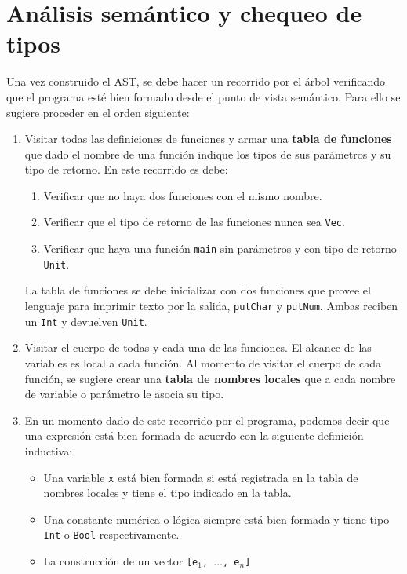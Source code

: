 \documentclass{article}
\begin{document}
\section{An\'alisis sem\'antico y chequeo de tipos}
\label{sec_analizador_semantico}

Una vez construido el AST, se debe hacer un recorrido por el \'arbol
verificando que el programa est\'e bien formado desde el punto de
vista sem\'antico. Para ello se sugiere proceder en el orden siguiente:
\begin{enumerate}
\item Visitar todas las definiciones de funciones y armar una {\bf tabla de funciones}
      que dado el nombre de una funci\'on indique los tipos de sus par\'ametros
      y su tipo de retorno. En este recorrido es debe:
      \begin{enumerate}
      \item Verificar que no haya dos funciones con el mismo nombre.
      \item Verificar que el tipo de retorno de las funciones nunca sea \texttt{Vec}.
      \item Verificar que haya una funci\'on \texttt{main} sin
            par\'ametros y con tipo de retorno \texttt{Unit}.
      \end{enumerate}
      La tabla de funciones se debe inicializar con dos funciones que
      provee el lenguaje para imprimir texto por la salida,
      \texttt{putChar} y \texttt{putNum}. Ambas reciben un \texttt{Int}
      y devuelven \texttt{Unit}.
\item Visitar el cuerpo de todas y cada una de las funciones.
      El alcance de las variables es local a cada funci\'on.
      Al momento de visitar el cuerpo de cada funci\'on, se sugiere crear una
      {\bf tabla de nombres locales} que a cada nombre de variable o par\'ametro
      le asocia su tipo.
\item En un momento dado de este recorrido por el programa,
      podemos decir que una expresi\'on est\'a bien formada
      de acuerdo con la siguiente definici\'on inductiva:
      \begin{itemize}
      \item Una variable \texttt{x} est\'a bien formada si est\'a registrada
            en la tabla de nombres locales y tiene el tipo indicado en la tabla.
      \item Una constante num\'erica o l\'ogica siempre est\'a bien formada
            y tiene tipo \texttt{Int} o \texttt{Bool} respectivamente.
      \item La construcci\'on de un vector \texttt{[e$_1$, $\hdots$, e$_n$]}

\end{itemize}
\end{enumerate}
\end{document}
